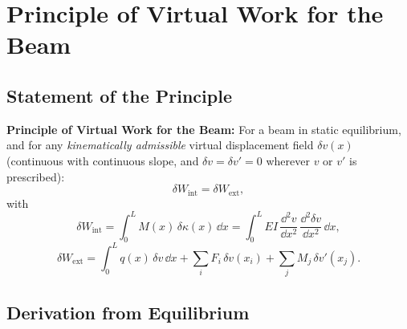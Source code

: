 \section{Principle of Virtual Work for the Beam}
\label{sec:beam_pvw}

\subsection{Statement of the Principle}

\begin{importantbox}
\textbf{Principle of Virtual Work for the Beam:}
For a beam in static equilibrium, and for any \emph{kinematically admissible}
virtual displacement field $\delta v(x)$ (continuous with continuous slope,
and $\delta v = \delta v' = 0$ wherever $v$ or $v'$ is prescribed):
\begin{equation}
    \delta W_{\mathrm{int}} = \delta W_{\mathrm{ext}} ,
    \label{eq:beam_pvw_statement}
\end{equation}
with
\[
    \delta W_{\mathrm{int}}
    = \int_0^L M(x)\,\delta\kappa(x)\,\dd x
    = \int_0^L EI\,\frac{\dd^2 v}{\dd x^2}\,\frac{\dd^2 \delta v}{\dd x^2}\,\dd x ,
\]
\[
    \delta W_{\mathrm{ext}}
    = \int_0^L q(x)\,\delta v\,\dd x
    + \sum_i F_i\,\delta v(x_i)
    + \sum_j M_j\,\delta v'(x_j) .
\]
\end{importantbox}

\subsection{Derivation from Equilibrium}

